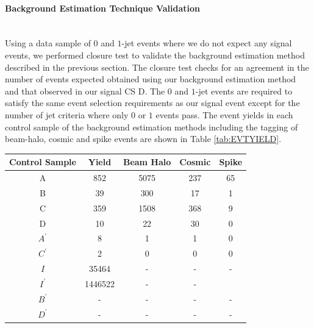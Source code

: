 \paragraph*{Background Estimation Technique Validation}\mbox{}\\
Using a data sample of $0$ and $1$-jet events where we do not expect any signal events, we performed closure test to validate the background estimation method described in the previous section.
The closure test checks for an agreement in the number of events expected obtained using our background estimation method and that observed in our signal CS \textsf{D}. The $0$ and $1$-jet events are required to satisfy the same event selection requirements as our signal event except for the number of jet criteria where only $0$ or $1$ events pass. The event yields in each control sample of the background estimation methods including the tagging of beam-halo, cosmic and spike events are shown in Table \ref{tab:EVTYIELD}.

\vspace{5mm}
\begin{minipage}{0.90\linewidth} 
\begin{center}
\begin{tabular}{c| c| c| c| c }
\toprule
 \hline
\bfseries{Control Sample} & Yield & Beam Halo & Cosmic & Spike \\
\hline
\toprule
\textsf{A} & 852 & 5075 & 237 & 65\\
\textsf{B} & 39 & 300&  17 &  1\\
\textsc{C} & 359 & 1508 & 368 & 9  \\
\textsf{D} & 10 & 22 & 30 & 0 \\
\hline\hline
\textsf{$A^{\prime}$}& 8 &  1& 1 & 0\\ 
\textsf{$C^{\prime}$}& 2 & 0 & 0 & 0\\  
\textsf{$I$} & 35464 & -& - & -\\    
\textsf{$I^{\prime}$}&  1446522 & - & - & \\       
\textsf{$B^{\prime}$}& - &-  & - & -\\    
\textsf{$D^{\prime}$}& - & - & - & -\\      
\hline
\bottomrule
\end{tabular}
\label{tab:EVTYIELD} 
\end{center}
\end{minipage}

